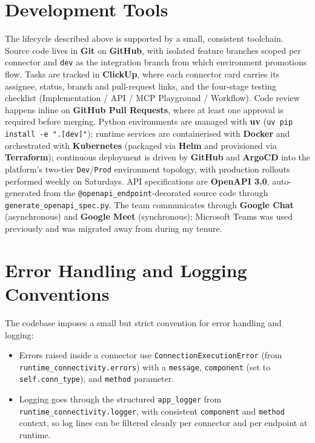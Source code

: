 \section{Development Tools}
The lifecycle described above is supported by a small, consistent
toolchain. Source code lives in \textbf{Git} on \textbf{GitHub}, with
isolated feature branches scoped per connector and \texttt{dev} as the
integration branch from which environment promotions flow. Tasks are
tracked in \textbf{ClickUp}, where each connector card carries its
assignee, status, branch and pull-request links, and the four-stage
testing checklist (Implementation / API / MCP Playground / Workflow).
Code review happens inline on \textbf{GitHub Pull Requests}, where at
least one approval is required before merging. Python environments
are managed with \textbf{uv} (\texttt{uv pip install -e ".[dev]"});
runtime services are containerised with \textbf{Docker} and
orchestrated with \textbf{Kubernetes} (packaged via \textbf{Helm} and
provisioned via \textbf{Terraform}); continuous deployment is driven
by \textbf{GitHub} and \textbf{ArgoCD} into the platform's two-tier
\texttt{Dev}/\texttt{Prod} environment topology, with production
rollouts performed weekly on Saturdays. API specifications are
\textbf{OpenAPI 3.0}, auto-generated from the
\texttt{@openapi\_endpoint}-decorated source code through
\texttt{generate\_openapi\_spec.py}. The team communicates through
\textbf{Google Chat} (asynchronous) and \textbf{Google Meet}
(synchronous); Microsoft Teams was used previously and was migrated
away from during my tenure.

\section{Error Handling and Logging Conventions}
The codebase imposes a small but strict convention for error handling
and logging:

\begin{itemize}[leftmargin=*]
    \item Errors raised inside a connector use
    \texttt{ConnectionExecutionError} (from
    \texttt{runtime\_connectivity.errors}) with a \texttt{message},
    \texttt{component} (set to \texttt{self.conn\_type}), and
    \texttt{method} parameter.
    \item Logging goes through the structured \texttt{app\_logger}
    from \texttt{runtime\_connectivity.logger}, with consistent
    \texttt{component} and \texttt{method} context, so log lines
    can be filtered cleanly per connector and per endpoint at runtime.
\end{itemize}